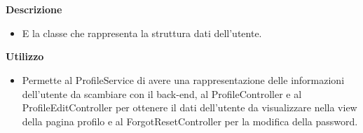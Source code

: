         \textbf{\\ \\ Descrizione} 
          \begin{itemize}
            \item[] E la classe che rappresenta la struttura dati dell'utente.
          \end{itemize}      
        \textbf{Utilizzo}  
          \begin{itemize}
            \item[] Permette al ProfileService di avere una rappresentazione delle informazioni dell'utente da scambiare con il back-end, al ProfileController e al ProfileEditController per ottenere il dati dell'utente da visualizzare nella view della pagina profilo e al ForgotResetController per la modifica della password.
          \end{itemize}